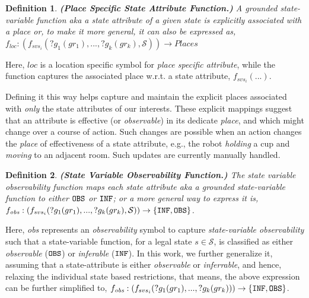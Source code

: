 \documentclass[letterpaper]{article} %
\newtheorem{definition}{Definition}
\begin{document}

\begin{definition}
    \textbf{(Place Specific State Attribute Function.)} A {\em grounded} state-variable function {\em aka} a state attribute of a given state is explicitly associated with a place or, to make it more general, it can also be expressed as, $f_{loc}: (f_{svs_i}(?g_1(gr_1),...,?g_k(gr_k),\mathcal{S})) \rightarrow 
    Places$
    \label{def:pssav}
\end{definition}
Here, $\mathit{loc}$ is a location specific symbol for {\em place specific attribute}, while the function captures the associated place w.r.t. a state attribute, $f_{svs_i}(...)$.

Defining it this way helps capture and maintain the explicit places associated with \textit{only} the state attributes of our interests. 
These explicit mappings suggest that an attribute is effective (or \textit{observable}) in its dedicate \textit{place}, and which might change over a course of action. 
Such changes are possible when an action changes the \textit{place} of effectiveness of a state attribute, e.g., the robot \textit{holding} a cup and \textit{moving} to an adjacent room. Such updates are currently manually handled.


\begin{definition}
\textbf{(State Variable Observability Function.)} 
The state variable observability function maps each state attribute {\em aka} a grounded \textit{state-variable function} 
to either $\texttt{OBS}$ or $\texttt{INF}$; or a more general way to express it is, $f_{\textit{obs}}: (f_{svs_i}(?g_1(gr_1),...,?g_k(gr_k),\mathcal{S}
)) \rightarrow 
    \{\texttt{INF}, \texttt{OBS}\}$.
    \label{def:svof}
\end{definition}
Here, \textit{obs} represents an \textit{observability} symbol to capture \textit{state-variable observability} such that a state-variable function, for a legal state $s\in\mathcal{S}$, is classified as either \textit{observable} ($\texttt{OBS}$) or \textit{inferable} ($\texttt{INF}$). 
In this work, we further generalize it, assuming that a state-attribute is either \textit{observable} or \textit{inferrable}, and hence, relaxing the individual state based restrictions, that means, the above expression can be further simplified to, $f_{\textit{obs}}: (f_{svs_i}(?g_1(gr_1),...,?g_k(gr_k))) \rightarrow 
    \{\texttt{INF}, \texttt{OBS}\}$.
\end{document}
